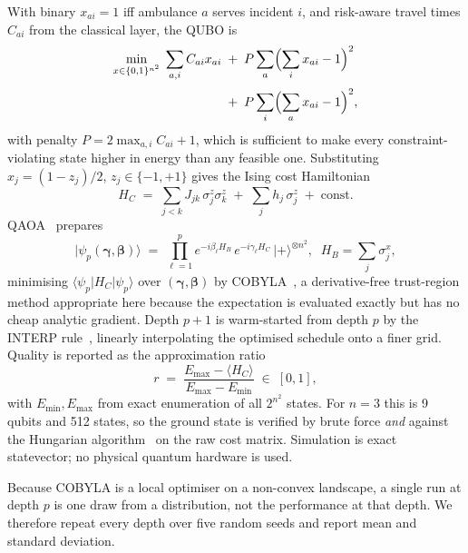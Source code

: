 \documentclass[10pt,twocolumn]{article}
\begin{document}
With binary $x_{ai}=1$ iff ambulance $a$ serves incident $i$, and risk-aware
travel times $C_{ai}$ from the classical layer, the QUBO is
\begin{equation}
\begin{aligned}
\min_{x\in\{0,1\}^{n^2}}\; \sum_{a,i} C_{ai}x_{ai}
\;&+\; P\sum_{a}\Bigl(\sum_i x_{ai}-1\Bigr)^{2} \\[2pt]
&+\; P\sum_{i}\Bigl(\sum_a x_{ai}-1\Bigr)^{2},
\end{aligned}
\label{eq:qubo}
\end{equation}
with penalty $P=2\max_{a,i}C_{ai}+1$, which is sufficient to make every
constraint-violating state higher in energy than any feasible one. Substituting
$x_j=(1-z_j)/2$, $z_j\in\{-1,+1\}$ gives the Ising cost
Hamiltonian~\citep{lucas2014}
\begin{equation}
H_C \;=\; \sum_{j<k} J_{jk}\,\sigma^z_j\sigma^z_k \;+\; \sum_j h_j\,\sigma^z_j
\;+\; \mathrm{const}.
\label{eq:ising}
\end{equation}
QAOA~\citep{farhi2014} prepares
\begin{equation}
\lvert\psi_p(\boldsymbol\gamma,\boldsymbol\beta)\rangle \;=\;
\prod_{\ell=1}^{p} e^{-i\beta_\ell H_B}\,e^{-i\gamma_\ell H_C}\,
\lvert +\rangle^{\otimes n^2},
\;\; H_B=\sum_j \sigma^x_j,
\label{eq:qaoa}
\end{equation}
minimising $\langle\psi_p\lvert H_C\rvert\psi_p\rangle$ over
$(\boldsymbol\gamma,\boldsymbol\beta)$ by COBYLA~\citep{powell1994}, a
derivative-free trust-region method appropriate here because the expectation is
evaluated exactly but has no cheap analytic gradient. Depth $p+1$ is warm-started
from depth $p$ by the INTERP rule~\citep{zhou2020}, linearly interpolating the
optimised schedule onto a finer grid. Quality is reported as the approximation
ratio
\begin{equation}
r \;=\; \frac{E_{\max}-\langle H_C\rangle}{E_{\max}-E_{\min}} \;\in\; [0,1],
\label{eq:ratio}
\end{equation}
with $E_{\min},E_{\max}$ from exact enumeration of all $2^{n^2}$ states. For
$n=3$ this is 9 qubits and 512 states, so the ground state is verified by brute
force \emph{and} against the Hungarian algorithm~\citep{kuhn1955} on the raw cost
matrix. Simulation is exact statevector; no physical quantum hardware is used.

Because COBYLA is a local optimiser on a non-convex landscape, a single run at
depth $p$ is one draw from a distribution, not the performance at that
depth. We therefore repeat every depth over five random seeds and report mean and
standard deviation.
\end{document}
